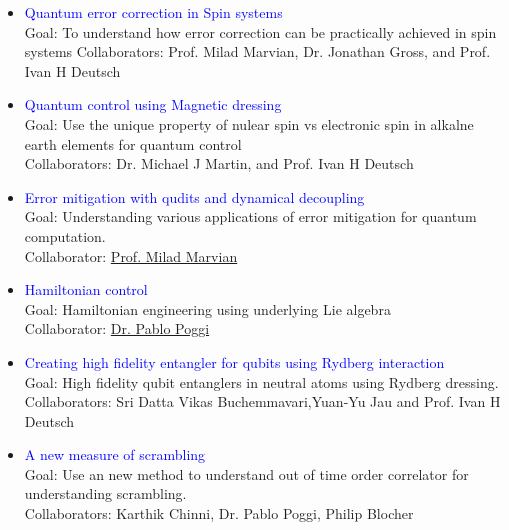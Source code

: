 \documentclass[14pt]{moderncv}
\begin{document}
\begin{minipage}{.95\textwidth}
\begin{itemize}
  
\item \textcolor{blue}{Quantum error correction in Spin systems}\\
Goal: To understand how error correction can be practically achieved in spin systems
Collaborators: Prof. Milad Marvian, Dr. Jonathan Gross, and Prof. Ivan H Deutsch


\item\textcolor{blue}{Quantum control using Magnetic dressing}\\
Goal: Use the unique property of nulear spin vs electronic spin in alkalne earth elements for quantum control\\
Collaborators: Dr. Michael J Martin, and Prof. Ivan H Deutsch

\item\textcolor{blue}{Error mitigation with qudits and dynamical decoupling}\\
Goal: Understanding various applications of error mitigation for quantum computation.\\
Collaborator: \href{http://www.unm.edu/~mmarvian/}{Prof. Milad Marvian} 

\item\textcolor{blue}{Hamiltonian control}\\
Goal: Hamiltonian engineering using underlying Lie algebra\\
Collaborator: \href{https://sites.google.com/view/pablopoggi/}{Dr. Pablo Poggi}

\item\textcolor{blue}{Creating high fidelity entangler for qubits using Rydberg interaction}\\
Goal: High fidelity qubit entanglers in neutral atoms using Rydberg dressing.\\
Collaborators: Sri Datta Vikas Buchemmavari,Yuan-Yu Jau and Prof. Ivan H Deutsch\\

\item\textcolor{blue}{A new measure of scrambling}\\
Goal: Use an new method to understand out of time order correlator for understanding scrambling.\\
Collaborators: Karthik Chinni, Dr. Pablo Poggi, Philip Blocher\\

\end{itemize}

\end{minipage}\\
\newpage
{}\\
\end{document}
